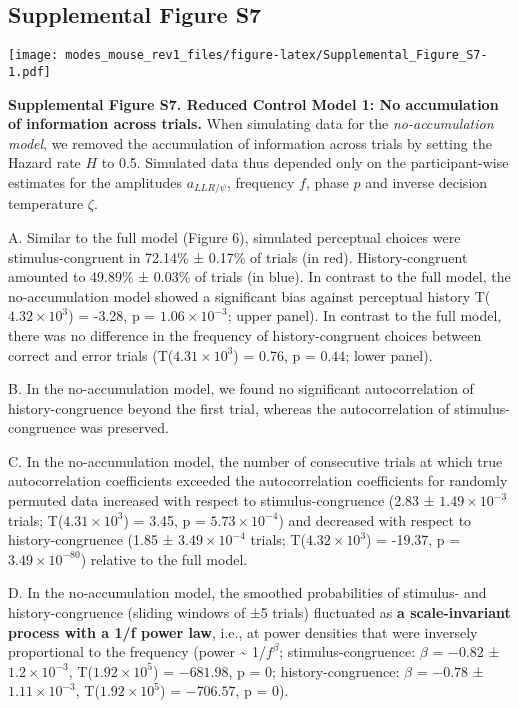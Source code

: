 \documentclass[
]{article}
\begin{document}
\newpage

\hypertarget{supplemental-figure-s7}{%
\subsection{Supplemental Figure S7}\label{supplemental-figure-s7}}

\texttt{[image: modes\_mouse\_rev1\_files/figure-latex/Supplemental\_Figure\_S7-1.pdf]}

\textbf{Supplemental Figure S7. Reduced Control Model 1: No accumulation
of information across trials.} When simulating data for the
\emph{no-accumulation model}, we removed the accumulation of information
across trials by setting the Hazard rate \(H\) to 0.5. Simulated data
thus depended only on the participant-wise estimates for the amplitudes
\(a_{LLR/\psi}\), frequency \(f\), phase \(p\) and inverse decision
temperature \(\zeta\).

A. Similar to the full model (Figure 6), simulated perceptual choices
were stimulus-congruent in 72.14\% ± 0.17\% of trials (in red).
History-congruent amounted to 49.89\% ± 0.03\% of trials (in blue). In
contrast to the full model, the no-accumulation model showed a
significant bias against perceptual history
T(\ensuremath{4.32\times 10^{3}}) = -3.28, p =
\(\ensuremath{1.06\times 10^{-3}}\); upper panel). In contrast to the
full model, there was no difference in the frequency of
history-congruent choices between correct and error trials
(T(\ensuremath{4.31\times 10^{3}}) = 0.76, p = \(0.44\); lower panel).

B. In the no-accumulation model, we found no significant autocorrelation
of history-congruence beyond the first trial, whereas the
autocorrelation of stimulus-congruence was preserved.

C. In the no-accumulation model, the number of consecutive trials at
which true autocorrelation coefficients exceeded the autocorrelation
coefficients for randomly permuted data increased with respect to
stimulus-congruence (2.83 ± \ensuremath{1.49\times 10^{-3}} trials;
T(\ensuremath{4.31\times 10^{3}}) = 3.45, p =
\(\ensuremath{5.73\times 10^{-4}}\)) and decreased with respect to
history-congruence (1.85 ± \ensuremath{3.49\times 10^{-4}} trials;
T(\ensuremath{4.32\times 10^{3}}) = -19.37, p =
\(\ensuremath{3.49\times 10^{-80}}\)) relative to the full model.

D. In the no-accumulation model, the smoothed probabilities of stimulus-
and history-congruence (sliding windows of ±5 trials) fluctuated as
\textbf{a scale-invariant process with a 1/f power law}, i.e., at power
densities that were inversely proportional to the frequency (power
\textasciitilde{} 1/\(f^\beta\); stimulus-congruence: \(\beta\) =
\(-0.82\) ± \(\ensuremath{1.2\times 10^{-3}}\),
T(\(\ensuremath{1.92\times 10^{5}}\)) = \(-681.98\), p = \(0\);
history-congruence: \(\beta\) = \(-0.78\) ±
\(\ensuremath{1.11\times 10^{-3}}\),
T(\(\ensuremath{1.92\times 10^{5}}\)) = \(-706.57\), p = \(0\)).
\end{document}
